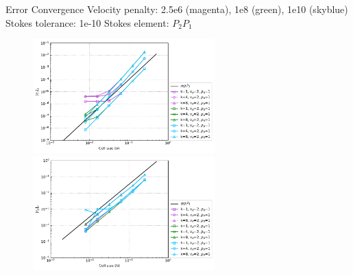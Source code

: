 \documentclass[10pt,aspectratio=169]{beamer}
\begin{document}
\begin{frame}{Error Convergence}
	Velocity penalty: 2.5e6 (magenta), 1e8 (green), 1e10 (skyblue) \newline
	Stokes tolerance: 1e-10 \newline
	Stokes element: $P_{2}P_{1}$
	\begin{figure}[!htb]
		\begin{multicols}{2}
			\includegraphics[width=7cm]{../Annulus_Benchmark_Thieulot/benchmark_figs/vel_err_conv_vel_penalty_1.0e+10_stokes_tol_1.0e-10_all_v_pen.pdf}\par
			\hspace{3.0in} 
			\includegraphics[width=7cm]{../Annulus_Benchmark_Thieulot/benchmark_figs/p_err_conv_vel_penalty_1.0e+10_stokes_tol_1.0e-10_all_v_pen.pdf}
		\end{multicols}
	\end{figure}
\end{frame}
\end{document}
